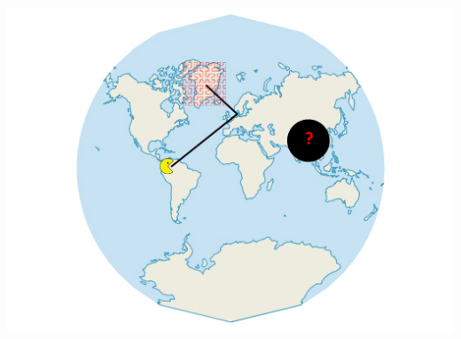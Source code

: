 \begin{minipage}[t]{185mm}
\vspace{2mm}
\includegraphics[width=\linewidth]{kort.jpg}

\end{minipage}
